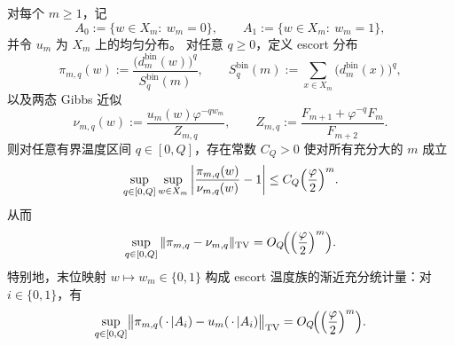 \begin{theorem}\label{thm:killo-fold-bin-escort-onebit-fisher}
对每个 \(m\ge 1\)，记
\[
A_0:=\{w\in X_m:\ w_m=0\},
\qquad
A_1:=\{w\in X_m:\ w_m=1\},
\]
并令 \(u_m\) 为 \(X_m\) 上的均匀分布。
对任意 \(q\ge 0\)，定义 escort 分布
\[
\pi_{m,q}(w):=\frac{\bigl(d_m^{\mathrm{bin}}(w)\bigr)^q}{S_q^{\mathrm{bin}}(m)},
\qquad
S_q^{\mathrm{bin}}(m):=\sum_{x\in X_m}\bigl(d_m^{\mathrm{bin}}(x)\bigr)^q,
\]
以及两态 Gibbs 近似
\[
\nu_{m,q}(w):=\frac{u_m(w)\varphi^{-q w_m}}{Z_{m,q}},
\qquad
Z_{m,q}:=\frac{F_{m+1}+\varphi^{-q}F_m}{F_{m+2}}.
\]
则对任意有界温度区间 \(q\in[0,Q]\)，存在常数 \(C_Q>0\) 使对所有充分大的 \(m\) 成立
\[
\sup_{q\in[0,Q]}\sup_{w\in X_m}
\left|
\frac{\pi_{m,q}(w)}{\nu_{m,q}(w)}-1
\right|
\le C_Q\Bigl(\frac{\varphi}{2}\Bigr)^m.
\]
从而
\[
\sup_{q\in[0,Q]}
\|\pi_{m,q}-\nu_{m,q}\|_{\mathrm{TV}}
=
O_Q\!\Bigl(\Bigl(\frac{\varphi}{2}\Bigr)^m\Bigr).
\]
特别地，末位映射 \(w\mapsto w_m\in\{0,1\}\) 构成 escort 温度族的渐近充分统计量：对 \(i\in\{0,1\}\)，有
\[
\sup_{q\in[0,Q]}
\bigl\|
\pi_{m,q}(\,\cdot\,|A_i)-u_m(\,\cdot\,|A_i)
\bigr\|_{\mathrm{TV}}
=
O_Q\!\Bigl(\Bigl(\frac{\varphi}{2}\Bigr)^m\Bigr).
\]
\end{theorem}
